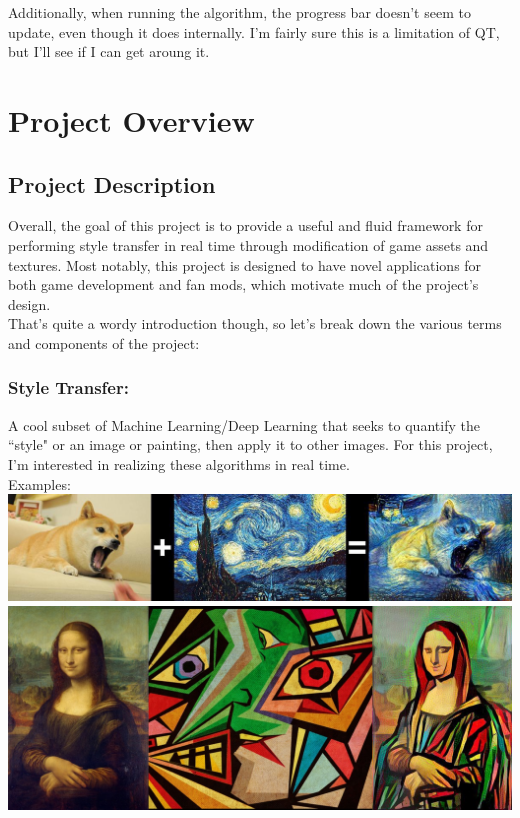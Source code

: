 \documentclass[12pt]{article}
\begin{document}
Additionally, when running the algorithm, the progress bar doesn't seem to update, even though it does internally. I'm fairly sure this is a limitation of QT, but I'll see if I can get aroung it.
\section{Project Overview}

\subsection{Project Description}
    Overall, the goal of this project is to provide a useful and fluid framework for performing style transfer in real time through modification of game assets and textures. 
    Most notably, this project is designed to have novel applications for both game development and fan mods, which motivate much of the project's design. \\
    That's quite a wordy introduction though, so let's break down the various terms and components of the project:

    \subsubsection{Style Transfer:}
    A cool subset of Machine Learning/Deep Learning that seeks to quantify the ``style" or an image or painting, then apply it to other images. 
    For this project, I'm interested in realizing these algorithms in real time.\\
    Examples: \\
    \includegraphics[width=\columnwidth]{ex1.jpg}\\
    \includegraphics[width=\columnwidth]{ex2.jpg}
\end{document}
